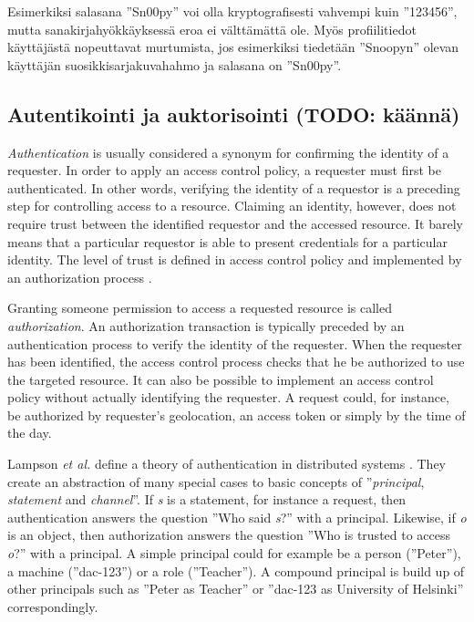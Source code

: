 \documentclass[english,gradu]{tktltiki}
\begin{document}
 Esimerkiksi salasana ''Sn00py'' voi olla kryptografisesti vahvempi kuin ''123456'', mutta
 sanakirjahyökkäyksessä eroa ei välttämättä ole. Myös profiilitiedot käyttäjästä nopeuttavat murtumista, jos
 esimerkiksi tiedetään ''Snoopyn'' olevan käyttäjän suosikkisarjakuvahahmo ja salasana on ''Sn00py''.


\subsection{Autentikointi ja auktorisointi (TODO: käännä)} %
\label{sub:autentikointi_ja_auktorisointi_todo_käännä_}

    \emph{Authentication} is usually considered a synonym for confirming the identity of a requester. In order to apply an access control policy, a requester must first be authenticated. In other words, verifying the identity of a requestor is a preceding step for controlling access to a resource. Claiming an identity, however, does not require trust between the identified requestor and the accessed resource. It barely means that a particular requestor is able to present credentials for a particular identity. The level of trust is defined in access control policy and implemented by an authorization process \cite{lampson_distributed_1992}.

  Granting someone permission to access a requested resource is called \emph{authorization}. An authorization transaction is typically preceded by an authentication process to verify the identity of the requester. When the requester has been identified, the access control process checks that he be authorized to use the targeted resource. It can also be possible to implement an access control policy without actually identifying the requester. A request could, for instance, be authorized by requester's geolocation, an access token or simply by the time of the day.

  Lampson \emph{et al.} define a theory of authentication in distributed systems
\cite{lampson_distributed_1992}. They create an abstraction of many special
cases to basic concepts of ''\emph{principal}, \emph{statement} and \emph{channel}''. If \emph{s}
is a statement, for instance a request, then authentication answers the
question ''Who said \emph{s}?'' with a principal. Likewise, if \emph{o} is an
object, then authorization answers the question ''Who is trusted to access
\emph{o}?'' with a principal. A simple principal could for example be a
person (''Peter''), a machine (''dac-123'') or a role (''Teacher''). A
compound principal is build up of other principals such as ''Peter as
Teacher'' or ''dac-123 as University of Helsinki'' correspondingly.
\end{document}
